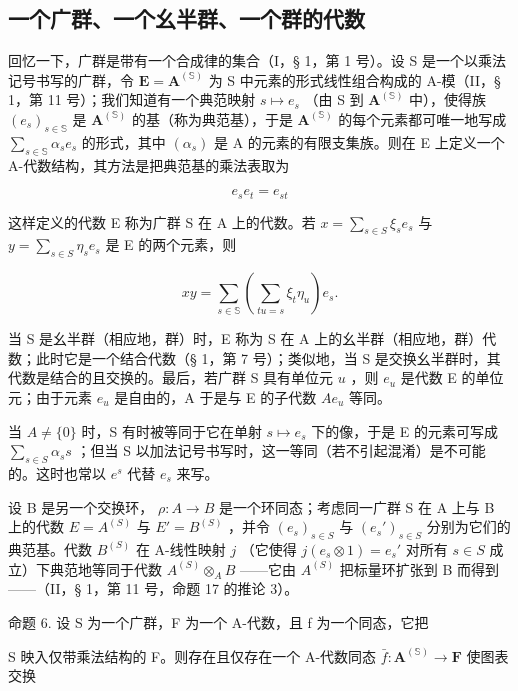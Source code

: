 \subsection{一个广群、一个幺半群、一个群的代数}

回忆一下，广群是带有一个合成律的集合（I，§ 1，第 1 号）。设 S 是一个以乘法记号书写的广群，令 \(\mathbf{E} = \mathbf{A}^{(\mathbb{S})}\) 为 S 中元素的形式线性组合构成的 A-模（II，§ 1，第 11 号）；我们知道有一个典范映射 \(s \mapsto e_s\) （由 S 到 \(\mathbf{A}^{(\mathbb{S})}\) 中），使得族 \((e_s)_{s \in \mathbb{S}}\) 是 \(\mathbf{A}^{(\mathbb{S})}\) 的基（称为典范基），于是 \(\mathbf{A}^{(\mathbb{S})}\) 的每个元素都可唯一地写成 \(\sum_{s \in \mathbb{S}} \alpha_s e_s\) 的形式，其中 \((\alpha_s)\) 是 A 的元素的有限支集族。则在 E 上定义一个 A-代数结构，其方法是把典范基的乘法表取为

\[
e _ {s} e _ {t} = e _ {s t}\tag{35}
\]

这样定义的代数 E 称为广群 S 在 A 上的代数。若 \(x = \sum_{s \in S} \xi_{s} e_{s}\) 与 \(y = \sum_{s \in S} \eta_{s} e_{s}\) 是 E 的两个元素，则

\[
x y = \sum_ {s \in \mathbb {S}} \left(\sum_ {t u = s} \xi_ {t} \eta_ {u}\right) e _ {s}.
\]

当 S 是幺半群（相应地，群）时，E 称为 S 在 A 上的幺半群（相应地，群）代数；此时它是一个结合代数（§ 1，第 7 号）；类似地，当 S 是交换幺半群时，其代数是结合的且交换的。最后，若广群 S 具有单位元 \(u\) ，则 \(e_u\) 是代数 E 的单位元；由于元素 \(e_u\) 是自由的，A 于是与 E 的子代数 \(Ae_u\) 等同。

当 \(A \neq \{0\}\) 时，S 有时被等同于它在单射 \(s \mapsto e_{s}\) 下的像，于是 E 的元素可写成 \(\sum_{s \in S} \alpha_{s}s\) ；但当 S 以加法记号书写时，这一等同（若不引起混淆）是不可能的。这时也常以 \(e^{s}\) 代替 \(e_{s}\) 来写。

设 B 是另一个交换环， \(\rho: A \to B\) 是一个环同态；考虑同一广群 S 在 A 上与 B 上的代数 \(E = A^{(S)}\) 与 \(E' = B^{(S)}\) ，并令 \((e_s)_{s \in S}\) 与 \((e_s')_{s \in S}\) 分别为它们的典范基。代数 \(B^{(S)}\) 在 A-线性映射 \(j\) （它使得 \(j(e_s \otimes 1) = e_s'\) 对所有 \(s \in S\) 成立）下典范地等同于代数 \(A^{(S)} \otimes_A B\) ——它由 \(A^{(S)}\) 把标量环扩张到 B 而得到——（II，§ 1，第 11 号，命题 17 的推论 3）。

命题 6. 设 S 为一个广群，F 为一个 A-代数，且 f 为一个同态，它把

S 映入仅带乘法结构的 F。则存在且仅存在一个 A-代数同态 \(\bar{f}:\mathbf{A}^{(\mathbb{S})}\to\mathbf{F}\) 使图表交换

